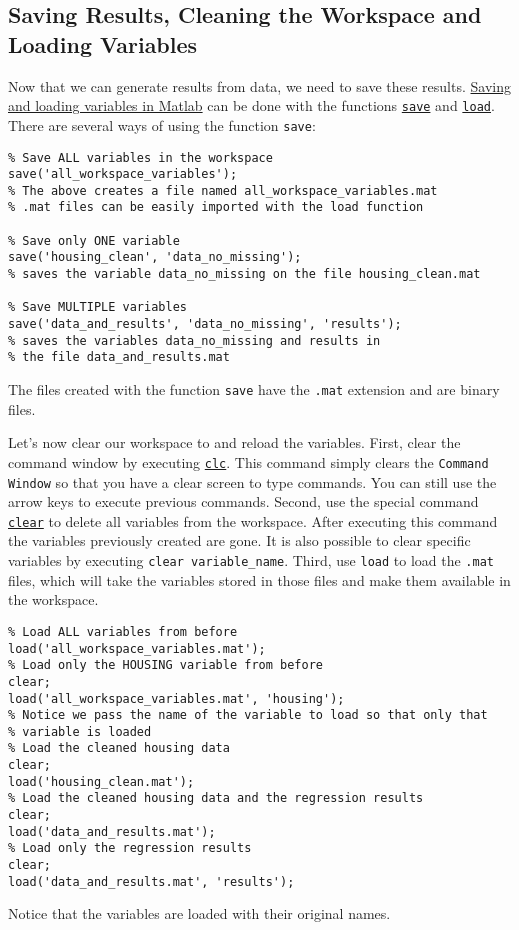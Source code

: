 \documentclass[12pt, a4paper]{article}
\begin{document}
\subsection{Saving Results, Cleaning the Workspace and Loading Variables}
\label{sec:org689afac}
Now that we can generate results from data, we need to save these results.
\href{https://www.mathworks.com/help/matlab/matlab\_env/save-load-and-delete-workspace-variables.html}{Saving and loading variables in Matlab} can be done with the functions \href{https://www.mathworks.com/help/matlab/ref/save.html}{\texttt{save}} and \href{https://www.mathworks.com/help/matlab/ref/load.html}{\texttt{load}}.
There are several ways of using the function \texttt{save}:
\lstset{language=matlab,label= ,caption= ,captionpos=b,firstnumber=1,numbers=left,style=Matlab-editor}
\begin{lstlisting}
% Save ALL variables in the workspace
save('all_workspace_variables');
% The above creates a file named all_workspace_variables.mat
% .mat files can be easily imported with the load function

% Save only ONE variable
save('housing_clean', 'data_no_missing');
% saves the variable data_no_missing on the file housing_clean.mat

% Save MULTIPLE variables
save('data_and_results', 'data_no_missing', 'results');
% saves the variables data_no_missing and results in
% the file data_and_results.mat
\end{lstlisting}
The files created with the function \texttt{save} have the \texttt{.mat} extension and are binary files.

Let's now clear our workspace to and reload the variables.
First, clear the command window by executing \href{https://www.mathworks.com/help/matlab/ref/clc.html}{\texttt{clc}}.
This command simply clears the \texttt{Command Window} so that you have a clear screen to type commands.
You can still use the arrow keys to execute previous commands.
Second, use the special command \href{https://www.mathworks.com/help/matlab/ref/clear.html}{\texttt{clear}} to delete all variables from the workspace.
After executing this command the variables previously created are gone.
It is also possible to clear specific variables by executing \texttt{clear variable\_name}.
Third, use \texttt{load} to load the \texttt{.mat} files, which will take the variables stored in those files and make them available in the workspace.
\lstset{language=matlab,label= ,caption= ,captionpos=b,firstnumber=1,numbers=left,style=Matlab-editor}
\begin{lstlisting}
% Load ALL variables from before
load('all_workspace_variables.mat');
% Load only the HOUSING variable from before
clear;
load('all_workspace_variables.mat', 'housing');
% Notice we pass the name of the variable to load so that only that
% variable is loaded
% Load the cleaned housing data
clear;
load('housing_clean.mat');
% Load the cleaned housing data and the regression results
clear;
load('data_and_results.mat');
% Load only the regression results
clear;
load('data_and_results.mat', 'results');
\end{lstlisting}
Notice that the variables are loaded with their original names.
\end{document}
